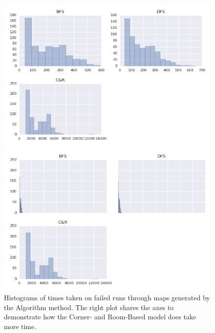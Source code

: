 \documentclass[12pt]{article}
\begin{document}
\begin{figure}[htbp]
\begin{minipage}{.48\linewidth}
\centering
\includegraphics[width=1\linewidth]{TimeHistAlgFailed.png} 
\end{minipage}
\begin{minipage}{.48\linewidth}
\centering
\includegraphics[width=1\linewidth]{TimeHistAlgFailedShare.png} 
\end{minipage}
\caption{Histograms of times taken on failed runs through maps generated by the Algorithm method. The right plot shares the axes to demonstrate how the Corner- and Room-Based model does take more time.}
\end{figure} 
\end{document}
